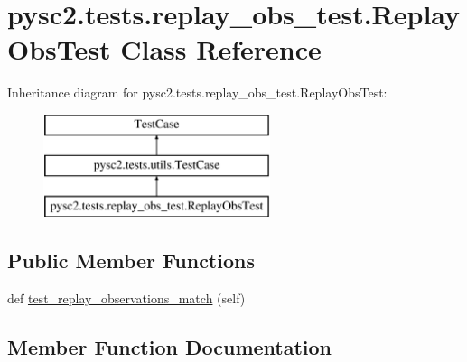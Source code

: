 \hypertarget{classpysc2_1_1tests_1_1replay__obs__test_1_1_replay_obs_test}{}\section{pysc2.\+tests.\+replay\+\_\+obs\+\_\+test.\+Replay\+Obs\+Test Class Reference}
\label{classpysc2_1_1tests_1_1replay__obs__test_1_1_replay_obs_test}
Inheritance diagram for pysc2.\+tests.\+replay\+\_\+obs\+\_\+test.\+Replay\+Obs\+Test\+:\begin{figure}[H]
\begin{center}
\leavevmode
\includegraphics[height=3.000000cm]{classpysc2_1_1tests_1_1replay__obs__test_1_1_replay_obs_test}
\end{center}
\end{figure}
\subsection*{Public Member Functions}
\begin{DoxyCompactItemize}
\item 
def \mbox{\hyperlink{classpysc2_1_1tests_1_1replay__obs__test_1_1_replay_obs_test_aa6c8b849a8a750ae988d2682f4d19860}{test\+\_\+replay\+\_\+observations\+\_\+match}} (self)
\end{DoxyCompactItemize}


\subsection{Member Function Documentation}
\mbox{\label{classpysc2_1_1tests_1_1replay__obs__test_1_1_replay_obs_test_aa6c8b849a8a750ae988d2682f4d19860}} 
